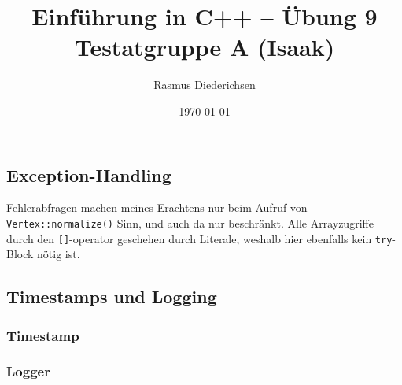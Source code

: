 \documentclass{article}
\title{Einführung in C++ -- Übung 9 \\ Testatgruppe A (Isaak)}
\author{Rasmus Diederichsen}
\date{\today}
\begin{document}
   \maketitle

   \setcounter{section}{9}

   \subsection{Exception-Handling}
   
   Fehlerabfragen machen meines Erachtens nur beim Aufruf von
   \texttt{Vertex::normalize()} Sinn, und auch da nur beschränkt. Alle
   Arrayzugriffe durch den \texttt{[]}-operator geschehen durch Literale,
   weshalb hier ebenfalls kein \texttt{try}-Block nötig ist.

   
   

   \subsection{Timestamps und Logging}
   
   \subsubsection*{Timestamp}
   
   

   \subsubsection*{Logger}
   
   
\end{document}
